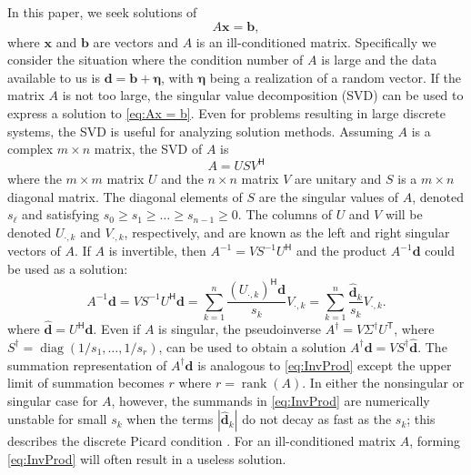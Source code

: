 \documentclass[12pt]{article}
\newcommand{\bVec}{\mathbf{b}}	%
\newcommand{\dVec}{\mathbf{d}}	%
\newcommand{\xVec}{\mathbf{x}}	%
\newcommand{\trans}[1]{{#1}^\mathsf{T}}	%
\newcommand{\ctrans}[1]{{#1}^\mathsf{H}}	%
\newcommand{\inv}[1]{{#1}^{-1}}	%
\DeclareMathOperator{\diag}{diag}	%
\DeclareMathOperator{\rank}{rank}	%
\newcommand{\noise}{\eta}	%
\newcommand{\noiseVec}{\bm{\noise}}	%
\newcommand{\singular}{s}	%
\newcommand{\svd}[1]{\widehat{#1}}	%
\begin{document}
In this paper, we seek solutions of 
\begin{equation}
\label{eq:Ax = b}
A\xVec = \bVec,
\end{equation}
where $\xVec$ and $\bVec$ are vectors and $A$ is an ill-conditioned matrix. Specifically we consider the situation where the condition number of $A$ is large and the data available to us is $\dVec = \bVec + \noiseVec$, with $\noiseVec$ being a realization of a random vector.  If the matrix $A$ is not too large, the singular value decomposition (SVD) can be used to express a solution to \eqref{eq:Ax = b}. Even for problems resulting in large discrete systems, the SVD is useful for analyzing solution methods.  Assuming $A$ is a complex $m \times n$ matrix, the SVD of $A$ is
\begin{equation}
\label{eq:SVD}
A = US\ctrans{V}
\end{equation}
where the $m \times m$ matrix $U$ and the $n \times n$ matrix $V$ are unitary and $S$ is a $m \times n$ diagonal matrix. The diagonal elements of $S$ are the singular values of $A$, denoted $\singular_\ell$ and satisfying $\singular_0 \geq \singular_1 \geq \ldots \geq \singular_{n-1} \geq 0$. The columns of $U$ and $V$ will be denoted $U_{\cdot,k}$ and $V_{\cdot,k}$, respectively, and are known as the left and right singular vectors of $A$. If $A$ is invertible, then $\inv{A} = V\inv{S}\ctrans{U}$ and the product $\inv{A}\dVec$ could be used as a solution:
\begin{equation}
\label{eq:InvProd}
\inv{A}\dVec = VS^{-1}{\ctrans{U}}\dVec = \sum_{k=1}^{n} \frac{{\ctrans{(U_{\cdot,k})}}\dVec}{\singular_k}V_{\cdot,k} = \sum_{k=1}^{n} \frac{\svd{\dVec}_k}{\singular_k}V_{\cdot,k}.
\end{equation}
where $\svd{\dVec} = \ctrans{U}\dVec$. Even if $A$ is singular, the pseudoinverse $A^\dagger = V{\Sigma^\dagger}\trans{U}$, where $S^\dagger = \diag(1/\singular_1,\ldots,1/\singular_{r})$, can be used to obtain a solution $A^\dagger\dVec = V{S^\dagger}\svd{\dVec}$. The summation representation of $A^\dagger\dVec$ is analogous to \eqref{eq:InvProd} except the upper limit of summation becomes $r$ where $r = \rank(A)$. In either the nonsingular or singular case for $A$, however, the summands in \eqref{eq:InvProd} are numerically unstable for small $\singular_k$ when the terms $|\svd{\dVec}_k|$ do not decay as fast as the $s_k$; this describes the discrete Picard condition \cite{Hansen:98}. For an ill-conditioned matrix $A$, forming \eqref{eq:InvProd} will often result in a useless solution. \par
\end{document}

